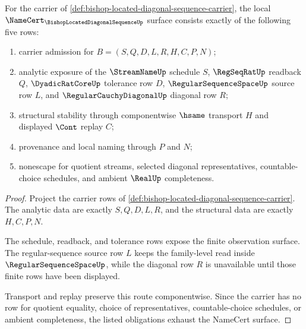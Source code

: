 \begin{theorem}
\label{thm:bishop-located-diagonal-sequence-namecert-obligations}
For the carrier of \autoref{def:bishop-located-diagonal-sequence-carrier}, the local $\NameCert_{\BishopLocatedDiagonalSequenceUp}$ surface consists exactly of the following five rows:
\begin{enumerate}
\item carrier admission for $B=(S,Q,D,L,R,H,C,P,N)$;
\item analytic exposure of the $\StreamNameUp$ schedule $S$, $\RegSeqRatUp$ readback $Q$, $\DyadicRatCoreUp$ tolerance row $D$, $\RegularSequenceSpaceUp$ source row $L$, and $\RegularCauchyDiagonalUp$ diagonal row $R$;
\item structural stability through componentwise $\hsame$ transport $H$ and displayed $\Cont$ replay $C$;
\item provenance and local naming through $P$ and $N$;
\item nonescape for quotient streams, selected diagonal representatives, countable-choice schedules, and ambient $\RealUp$ completeness.
\end{enumerate}
\end{theorem}
\begin{proof}
Project the carrier rows of \autoref{def:bishop-located-diagonal-sequence-carrier}. The analytic data are exactly $S,Q,D,L,R$, and the structural data are exactly $H,C,P,N$.

The schedule, readback, and tolerance rows expose the finite observation surface. The regular-sequence source row $L$ keeps the family-level read inside $\RegularSequenceSpaceUp$, while the diagonal row $R$ is unavailable until those finite rows have been displayed.

Transport and replay preserve this route componentwise. Since the carrier has no row for quotient equality, choice of representatives, countable-choice schedules, or ambient completeness, the listed obligations exhaust the NameCert surface.
\end{proof}

